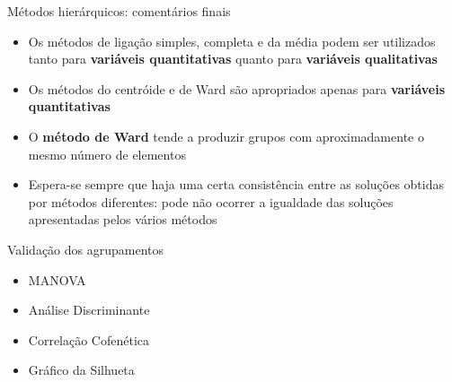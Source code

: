 \documentclass[
  ignorenonframetext,
  aspectratio=169,
]{beamer}
\providecommand{\tightlist}{%
  \setlength{\itemsep}{0pt}\setlength{\parskip}{0pt}}
\begin{document}
\begin{frame}{Métodos hierárquicos: comentários finais}
\protect{}\label{muxe9todos-hieruxe1rquicos-comentuxe1rios-finais-3}
\begin{itemize}
\tightlist
\item
  Os métodos de ligação simples, completa e da média podem ser
  utilizados tanto para \textbf{variáveis quantitativas} quanto para
  \textbf{variáveis qualitativas}
\end{itemize}

\pause

\begin{itemize}
\tightlist
\item
  Os métodos do centróide e de Ward são apropriados apenas para
  \textbf{variáveis quantitativas}
\end{itemize}

\pause

\begin{itemize}
\tightlist
\item
  O \textbf{método de Ward} tende a produzir grupos com aproximadamente
  o mesmo número de elementos
\end{itemize}

\pause

\begin{itemize}
\tightlist
\item
  Espera-se sempre que haja uma certa consistência entre as soluções
  obtidas por métodos diferentes: pode não ocorrer a igualdade das
  soluções apresentadas pelos vários métodos
\end{itemize}
\end{frame}

\begin{frame}{Validação dos agrupamentos}
\protect{}\label{validauxe7uxe3o-dos-agrupamentos}
\begin{itemize}
\tightlist
\item
  MANOVA
\end{itemize}

\pause

\begin{itemize}
\tightlist
\item
  Análise Discriminante
\end{itemize}

\pause

\begin{itemize}
\tightlist
\item
  Correlação Cofenética
\end{itemize}

\pause

\begin{itemize}
\tightlist
\item
  Gráfico da Silhueta
\end{itemize}
\end{frame}
\end{document}
